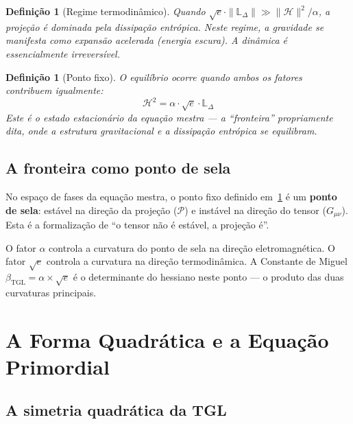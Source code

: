 \documentclass[12pt,a4paper,twoside]{article}
\newtheorem{definition}[theorem]{Definição}
\newcommand{\betatgl}{\beta_{\!\scriptscriptstyle\mathrm{TGL}}}
\begin{document}
\begin{definition}[Regime termodinâmico]
Quando $\sqrt{e} \cdot \|\mathbb{L}_\Delta\| \gg \|\mathcal{H}\|^2/\alpha$, a projeção é dominada pela dissipação entrópica. Neste regime, a gravidade se manifesta como expansão acelerada (energia escura). A dinâmica é essencialmente irreversível.
\end{definition}

\begin{definition}[Ponto fixo]
\label{def:ponto_fixo}
O equilíbrio ocorre quando ambos os fatores contribuem igualmente:
\begin{equation}
\mathcal{H}^2 = \alpha \cdot \sqrt{e} \cdot \mathbb{L}_\Delta
\end{equation}
Este é o estado estacionário da equação mestra --- a ``fronteira'' propriamente dita, onde a estrutura gravitacional e a dissipação entrópica se equilibram.
\end{definition}


\subsection{A fronteira como ponto de sela}

No espaço de fases da equação mestra, o ponto fixo definido em~\ref{def:ponto_fixo} é um \textbf{ponto de sela}: estável na direção da projeção ($\mathcal{P}$) e instável na direção do tensor ($G_{\mu\nu}$). Esta é a formalização de ``o tensor não é estável, a projeção é''.

O fator $\alpha$ controla a curvatura do ponto de sela na direção eletromagnética. O fator $\sqrt{e}$ controla a curvatura na direção termodinâmica. A Constante de Miguel $\betatgl = \alpha \times \sqrt{e}$ é o determinante do hessiano neste ponto --- o produto das duas curvaturas principais.



\section{A Forma Quadrática e a Equação Primordial}
\label{sec:quadratica}

\subsection{A simetria quadrática da TGL}
\end{document}
